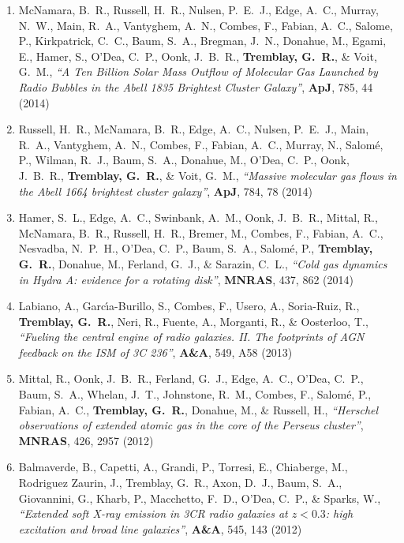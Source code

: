 \documentclass[11pt]{article}
\begin{document}
\begin{enumerate}[resume]
\item McNamara, B.~R., Russell, H.~R., Nulsen, P.~E.~J., Edge, A.~C., Murray,
N.~W., Main, R.~A., Vantyghem, A.~N., Combes, F., Fabian, A.~C., Salome,
P., Kirkpatrick, C.~C., Baum, S.~A., Bregman, J.~N., Donahue, M., Egami,
E., Hamer, S., O'Dea, C.~P., Oonk, J.~B.~R., \textbf{Tremblay, G.~R.},
\& Voit, G.~M., \textit{``A Ten Billion Solar Mass Outflow of Molecular Gas Launched by Radio Bubbles in the Abell 1835 Brightest Cluster Galaxy''}, \textbf{ApJ}, 785, 44 (2014)


\item Russell, H.~R., McNamara, B.~R., Edge, A.~C., Nulsen, P.~E.~J., Main,
R.~A., Vantyghem, A.~N., Combes, F., Fabian, A.~C., Murray, N., Salom\'{e}, P.,
Wilman, R.~J., Baum, S.~A., Donahue, M., O'Dea, C.~P., Oonk, J.~B.~R.,
\textbf{Tremblay, G.~R.},
\& Voit, G.~M.,  \textit{``Massive molecular gas flows in the Abell 1664 brightest cluster galaxy''}, \textbf{ApJ}, 784, 78 (2014)



\item Hamer, S.~L., Edge, A.~C., Swinbank, A.~M., Oonk, J.~B.~R., Mittal, R., McNamara, B.~R., Russell, H.~R., Bremer, M., Combes, F., Fabian, A.~C., Nesvadba, N.~P.~H., O'Dea, C.~P., Baum, S.~A., Salom\'{e}, P., \textbf{Tremblay, G.~R.}, Donahue, M., Ferland, G.~J., \& Sarazin, C.~L.,  \textit{``Cold gas dynamics in Hydra A: evidence for a rotating disk''}, \textbf{MNRAS}, 437, 862 (2014)




\item Labiano, A., Garc{\'{\i}}a-Burillo, S., Combes, F., Usero, A.,
Soria-Ruiz, R., \textbf{Tremblay, G.~R.}, Neri, R., Fuente, A., Morganti, R.,
\& Oosterloo, T.,  \textit{``Fueling the central engine of radio galaxies. II. The footprints of AGN feedback on the ISM of 3C 236''}, \textbf{A\&A}, 549,  A58 (2013)


\item Mittal, R., Oonk, J.~B.~R., Ferland, G.~J., Edge, A.~C., O'Dea, C.~P.,
Baum, S.~A., Whelan, J.~T., Johnstone, R.~M., Combes, F., Salom{\'e}, P.,
Fabian, A.~C., \textbf{Tremblay, G.~R.}, Donahue, M.,
\& Russell, H., \textit{``Herschel observations of extended atomic gas in the core of the Perseus cluster''}, \textbf{MNRAS}, 426,  2957 (2012)




\item Balmaverde, B., Capetti, A., Grandi, P., Torresi, E., Chiaberge, M.,
Rodriguez Zaurin, J., Tremblay, G.~R., Axon, D.~J., Baum, S.~A.,
Giovannini, G., Kharb, P., Macchetto, F.~D., O'Dea, C.~P.,
\& Sparks, W., \textit{``Extended soft X-ray emission in 3CR radio galaxies at $z< 0.3$: high excitation and broad line galaxies''}, \textbf{A\&A}, 545,  143 (2012)





\end{enumerate}
\end{document}
